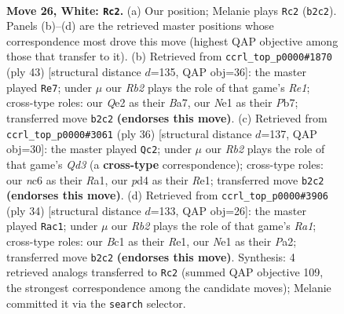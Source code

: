 \documentclass[11pt]{article}
\begin{document}
\clearpage

\begin{figure}[p]\centering
\begin{subfigure}{0.46\textwidth}\centering
\resizebox{\linewidth}{!}{%
\newchessgame
\chessboard[
  setfen={2rq2r1/4bp1k/2n2n2/p6p/1p1p2p1/1P1P2P1/PR2QP1P/RNB1N1K1 w - - 8 26},
  showmover=false,
  pgfstyle=straightmove, color=movearrow, markmove={b2-c2}
]}
\caption{}
\end{subfigure}\hfill
\begin{subfigure}{0.46\textwidth}\centering
\resizebox{\linewidth}{!}{%
\newchessgame
\chessboard[
  setfen={r3r1k1/bpqn1pp1/2p1n1p1/p3P3/P6P/2N2NP1/1P2QPK1/R1BR4 b - - 0 22},
  showmover=false,
  pgfstyle=straightmove, color=movearrow, markmove={e8-e7}
]}
\caption{}
\end{subfigure}
\\[4pt]
\begin{subfigure}{0.46\textwidth}\centering
\resizebox{\linewidth}{!}{%
\newchessgame
\chessboard[
  setfen={r4rk1/1p2nqpp/1np2p2/p2p4/P2P4/2NQP2P/1P1N1PP1/R3R1K1 w - - 0 19},
  showmover=false,
  pgfstyle=straightmove, color=movearrow, markmove={d3-c2}
]}
\caption{}
\end{subfigure}\hfill
\begin{subfigure}{0.46\textwidth}\centering
\resizebox{\linewidth}{!}{%
\newchessgame
\chessboard[
  setfen={2rqr1k1/pp3p2/2n2np1/2pp3p/8/1P1PP2P/PQ1NBPP1/R3R1K1 w - - 2 18},
  showmover=false,
  pgfstyle=straightmove, color=movearrow, markmove={a1-c1}
]}
\caption{}
\end{subfigure}
\caption{\textbf{Move 26, White: \texttt{Rc2}.} (a) Our position; Melanie plays \texttt{Rc2} (\texttt{b2c2}). Panels (b)--(d) are the retrieved master positions whose correspondence most drove this move (highest QAP objective among those that transfer to it). (b) Retrieved from \texttt{ccrl\_top\_p0000\#1870} (ply 43) [structural distance $d$=135, QAP obj=36]: the master played \texttt{Re7}; under $\mu$ our \emph{Rb2} plays the role of that game's \emph{Re1}; cross-type roles: our \emph{Q}e2 as their \emph{B}a7, our \emph{N}e1 as their \emph{P}b7; transferred move \texttt{b2c2} \textbf{(endorses this move)}. (c) Retrieved from \texttt{ccrl\_top\_p0000\#3061} (ply 36) [structural distance $d$=137, QAP obj=30]: the master played \texttt{Qc2}; under $\mu$ our \emph{Rb2} plays the role of that game's \emph{Qd3} (a \textbf{cross-type} correspondence); cross-type roles: our \emph{n}c6 as their \emph{R}a1, our \emph{p}d4 as their \emph{R}e1; transferred move \texttt{b2c2} \textbf{(endorses this move)}. (d) Retrieved from \texttt{ccrl\_top\_p0000\#3906} (ply 34) [structural distance $d$=133, QAP obj=26]: the master played \texttt{Rac1}; under $\mu$ our \emph{Rb2} plays the role of that game's \emph{Ra1}; cross-type roles: our \emph{B}c1 as their \emph{R}e1, our \emph{N}e1 as their \emph{P}a2; transferred move \texttt{b2c2} \textbf{(endorses this move)}. Synthesis: 4 retrieved analogs transferred to \texttt{Rc2} (summed QAP objective 109, the strongest correspondence among the candidate moves); Melanie committed it via the \texttt{search} selector.}
\label{fig:thought-m50}
\end{figure}
\end{document}

